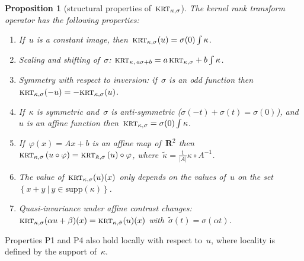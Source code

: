 \documentclass[12pt]{article}                  %
\newtheorem{proposition}{Proposition}
\begin{document}
\begin{proposition}[structural properties of~$\textsc{krt}_{\kappa,\sigma}$]
	The kernel rank transform operator has the following properties:
	\begin{enumerate}
		\item[\bf P1] If~$u$ is a constant image,
			then~$\textsc{krt}_{\kappa,\sigma}(u)=\sigma(0)\int\kappa$.
		\item[\bf P2] Scaling and shifting of~$\sigma$:
			$\textsc{krt}_{\kappa,\,a\sigma+b}=a\,\textsc{krt}_{\kappa,\sigma}+b\int\kappa$.
		\item[\bf P3] Symmetry with respect to inversion: if~$\sigma$
			is an odd function
			then~$\textsc{krt}_{\kappa,\sigma}(-u)=-\textsc{krt}_{\kappa,\sigma}(u)$.
		\item[\bf P4] If~$\kappa$ is symmetric and~$\sigma$ is
			anti-symmetric ($\sigma(-t)+\sigma(t)=\sigma(0)$),
			and~$u$ is an affine function
			then~$\textsc{krt}_{\kappa,\sigma}=\sigma(0)\int\kappa$.
		\item[\bf P5] If~$\varphi(x)=Ax+b$ is an affine map
			of~$\mathbf{R}^2$
			then\\
			$\displaystyle
			\textsc{krt}_{\kappa,\sigma}\left(u\circ\varphi\right) =
			\textsc{krt}_{\tilde\kappa,\sigma}\left(u\right)\circ\varphi$,
			where~$\tilde\kappa=\frac1{|A|}\kappa\circ A^{-1}$.
		\item[\bf P6] The value of~$\textsc{krt}_{\kappa,\sigma}(u)(x)$
			only depends on the values of~$u$ on the
			set~$\left\{x+y\ |\ y\in\mathrm{supp}(\kappa)\right\}$.
		\item[\bf P7] Quasi-invariance under affine contrast changes:
		$\textsc{krt}_{\kappa,\sigma}(\alpha u+\beta)(x)
		=
		\textsc{krt}_{\kappa,\tilde\sigma}(u)(x)
		$
		with~$\tilde\sigma(t)=\sigma(\alpha t)$.
	\end{enumerate}
\end{proposition}

Properties P1 and P4 also hold locally with respect to~$u$, where locality is
defined by the support of~$\kappa$.
\end{document}
